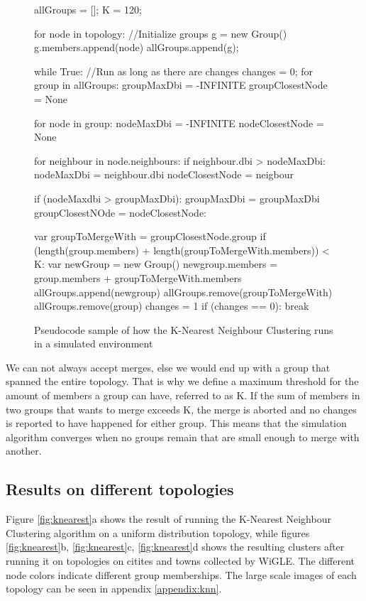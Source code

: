 	\begin{figure}
		\tiny
		\begin{python}
allGroups = [];
K = 120;

for node in topology: //Initialize groups
	g = new Group()
	g.members.append(node)
	allGroups.append(g);

while True: //Run as long as there are changes
	changes = 0;	
	for group in allGroups: 
		groupMaxDbi = -INFINITE
		groupClosestNode = None

		for node in group:
			nodeMaxDbi = -INFINITE
			nodeClosestNode = None

			for neighbour in node.neighbours:
				if neighbour.dbi > nodeMaxDbi:
					nodeMaxDbi = neighbour.dbi
					nodeClosestNode = neigbour

			if (nodeMaxdbi > groupMaxDbi):
				groupMaxDbi = groupMaxDbi
				groupClosestNOde = nodeClosestNode:

		var groupToMergeWith = groupClosestNode.group
		if (length(group.members) + length(groupToMergeWith.members)) < K:
			var newGroup = new Group()
			newgroup.members = group.members + groupToMergeWith.members
			allGroups.append(newgroup)
			allGroups.remove(groupToMergeWith)
			allGroups.remove(group)
			changes = 1
	if (changes == 0):
		break
		\end{python}
			\caption{Pseudocode sample of how the K-Nearest Neighbour Clustering runs in a simulated environment}
			\label{fig:groupmerge}
	\end{figure}



We can not always accept merges, else we would end up with a group that spanned the entire topology. That is why we define a maximum threshold for the amount of members a group can have, 
referred to as K. If the sum of members in two groups that wants to merge exceeds K, the merge is aborted and no changes is reported to have happened for either group. 
This means that the simulation algorithm converges when no groups remain that are small enough to merge with another.
 
\subsection{Results on different topologies}
Figure \ref{fig:knearest}a shows the result of running the K-Nearest Neighbour Clustering algorithm on a uniform distribution topology, while figures \ref{fig:knearest}b, \ref{fig:knearest}c, \ref{fig:knearest}d shows the resulting clusters after running it on topologies on citites and towns collected by WiGLE. The different node colors indicate different group memberships. The large scale images of each topology can be seen in appendix \ref{appendix:knn}.


